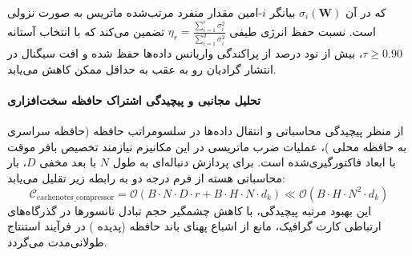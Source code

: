 که در آن $\sigma_i(\mathbf{W})$ بیانگر $i$-امین مقدار منفرد مرتب‌شده ماتریس به صورت نزولی است. نسبت حفظ انرژی طیفی $\eta_r = \frac{\sum_{i=1}^r \sigma_i^2}{\sum_{i=1}^{d} \sigma_i^2}$ تضمین می‌کند که با انتخاب آستانه $\tau \ge 0.90$، بیش از نود درصد از پراکندگی واریانس داده‌ها حفظ شده و افت سیگنال در انتشار گرادیان رو به عقب به حداقل ممکن کاهش می‌یابد.

\paragraph{تحلیل مجانبی و پیچیدگی اشتراک حافظه سخت‌افزاری}
از منظر پیچیدگی محاسباتی و انتقال داده‌ها در سلسومراتب حافظه (حافظه سراسری  به حافظه محلی )، عملیات ضرب ماتریسی در این مکانیزم نیازمند تخصیص بافر موقت با ابعاد فاکتورگیری‌شده است. برای پردازش دنباله‌ای به طول $N$ با بعد مخفی $D$، بار محاسباتی هسته از فرم درجه دو به رابطه زیر تقلیل می‌یابد:
\begin{equation}
\label{eq:complexity_cachenotes_compressor}
\mathcal{C}_{\text{cachenotes\_compressor}} = \mathcal{O}\left( B \cdot N \cdot D \cdot r + B \cdot H \cdot N \cdot d_k \right) \ll \mathcal{O}\left( B \cdot H \cdot N^2 \cdot d_k \right)
\end{equation}
این بهبود مرتبه پیچیدگی، با کاهش چشمگیر حجم تبادل تانسورها در گذرگاه‌های ارتباطی کارت گرافیک، مانع از اشباع پهنای باند حافظه (پدیده ) در فرآیند استنتاج طولانی‌مدت می‌گردد.
